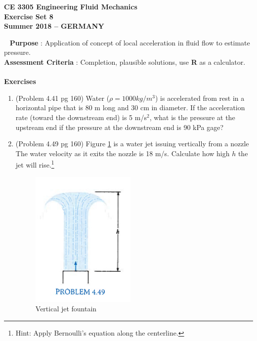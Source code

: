 \documentclass[12pt]{article}
\begin{document}
\begingroup
\begin{center}
{\textbf{{ CE 3305 Engineering Fluid Mechanics} \\ Exercise Set 8 \\ Summer 2018 -- GERMANY} }
\end{center}
\endgroup
\begingroup
~\newline
\textbf{Purpose} :  Application of concept of local acceleration in fluid flow to estimate pressure.\\
\textbf{Assessment Criteria} : Completion, plausible solutions, use \textbf{R} as a calculator. \\~\\
\textbf{Exercises}

\begin{enumerate}
\item (Problem 4.41 pg 160)
Water ($\rho = 1000 kg/m^3$) is accelerated from rest in a horizontal pipe that is 80 m long and 30 cm in diameter.  If the acceleration rate (toward the downstream end) is 5 m/s$^2$, what is the pressure at the upstream end if the pressure at the downstream end is 90 kPa gage? 


\item (Problem 4.49 pg 160)
Figure \ref{fig:Fountain} is a water jet issuing vertically from a nozzle   The water velocity as it exits the nozzle is 18 m/s.  Calculate how high $h$ the jet will rise.\footnote{Hint: Apply Bernoulli's equation along the centerline.}

\begin{figure}[htbp] %
   \centering
   \includegraphics[width=2in]{Fountain.jpg} 
   \caption{Vertical jet fountain}
   \label{fig:Fountain}
\end{figure}

\end{enumerate}
\end{document}
